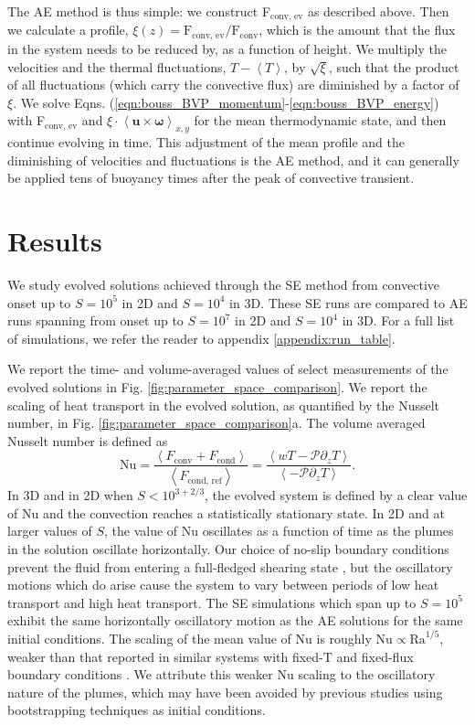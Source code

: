 \documentclass[aps, pre, onecolumn, nofootinbib, notitlepage, groupedaddress, amsfonts, amssymb, amsmath, longbibliography]{revtex4-1}
\newcommand{\angles}[1]{\ensuremath{\left\langle #1 \right\rangle}}
\begin{document}
The AE method is thus simple: we construct F$_{\text{conv, ev}}$ as described above.
Then we calculate a profile, 
$\xi(z) = \text{F}_{\text{conv, ev}}/\text{F}_{\text{conv}}$, which is the amount that the
flux in the system needs to be reduced by, as a function of height.
We multiply the velocities
and the thermal fluctuations, $T - \angles{T}$, by $\sqrt{\xi}$, such that the product of all fluctuations
(which carry the convective flux) are diminished by a factor of $\xi$.  We solve
Eqns. (\ref{eqn:bouss_BVP_momentum}-\ref{eqn:bouss_BVP_energy}) with F$_{\text{conv, ev}}$
and $\xi\cdot\angles{\bm{u}\times\bm{\omega}}_{x,y}$ for the mean thermodynamic state,
and then continue evolving in time.  This adjustment of the mean profile and the
diminishing of velocities and fluctuations is the AE method, and it can generally
be applied tens of buoyancy times after the peak of convective transient.

\section{Results}
\label{sec:results}
We study evolved solutions achieved through the SE method from convective onset
up to $S = 10^5$ in 2D and $S = 10^4$ in 3D.  These SE runs are compared to
AE runs spanning from onset up to $S = 10^7$ in 2D and $S = 10^4$ in 3D.
For a full list of simulations, we refer the reader to appendix \ref{appendix:run_table}.

We report the time- and volume-averaged values of select measurements of the
evolved solutions in Fig. \ref{fig:parameter_space_comparison}.  We report
the scaling of heat transport in the evolved solution, as quantified by the
Nusselt number, in Fig. \ref{fig:parameter_space_comparison}a.
The volume averaged Nusselt number is defined as
\begin{equation}
\text{Nu} = \frac{\angles{F_{\text{conv}} + F_{\text{cond}}}}{\angles{F_{\text{cond, ref}}}}
 = \frac{\angles{wT - \mathcal{P}\partial_z T}}{\angles{- \mathcal{P} \partial_z T}}.
\end{equation}
In 3D and in 2D when $S < 10^{3+2/3}$, the evolved system is defined by a clear
value of Nu and the convection reaches a statistically stationary state.
In 2D and at larger values of $S$, the value of Nu oscillates as a function of time
as the plumes in the solution oscillate horizontally.  Our choice of no-slip
boundary conditions prevent the fluid from entering a full-fledged shearing state
\cite{goluskin&all2014}, but the oscillatory motions which do arise cause the
system to vary between periods of low heat transport and high heat transport.
The SE simulations which span up to $S = 10^5$ exhibit the same horizontally
oscillatory motion as the AE solutions for the same initial conditions. The
scaling of the mean value of Nu is roughly $\text{Nu} \propto \text{Ra}^{1/5}$,
weaker than that reported in similar systems with fixed-T and fixed-flux boundary
conditions \cite{johnston&doering2009}.  We attribute this weaker Nu scaling to
the oscillatory nature of the plumes, which may have been avoided by previous studies
using bootstrapping techniques as initial conditions.
\end{document}

